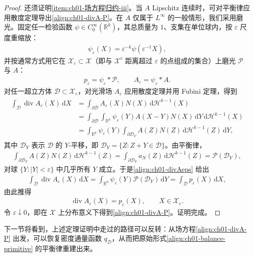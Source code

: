 \documentclass[../../main.tex]{subfiles}
\begin{document}
\begin{proof}
还须证明\cref{item:ch01-场方程归约-iii}。当 $A$ Lipschitz 连续时，可对平衡律应用散度定理导出\cref{align:ch01-divA-P}。在 $A$ 仅属于 $L^{\infty}$ 的一般情形，我们采用磨光。固定任一检验函数 $\psi\in C_{0}^{\infty}(\mathbb{R}^{k})$，其总质量为 $1$、支集在单位球内，按 $\varepsilon$ 尺度重缩放：
\begin{align}
\psi_{\varepsilon}(X)=\varepsilon^{-k}\psi(\varepsilon^{-1}X),\label{align:ch01-mollifier}
\end{align}
并按通常方式用它在 $\mathscr{X}_{\varepsilon}\subset\mathscr{X}$（即与 $\mathscr{X}^{c}$ 距离超过 $\varepsilon$ 的点组成的集合）上磨光 $\mathscr{P}$ 与 $A$：
\begin{align}
p_{\varepsilon}=\psi_{\varepsilon}*\mathscr{P},\qquad A_{\varepsilon}=\psi_{\varepsilon}*A.\label{align:ch01-mollified}
\end{align}
对任一超立方体 $\mathscr{D}\subset\mathscr{X}_{\varepsilon}$，对光滑场 $A_{\varepsilon}$ 应用散度定理并用 Fubini 定理，得到
\begin{align}
\begin{aligned}
\int_{\mathscr{D}}\operatorname{div} A_{\varepsilon}(X)\,\mathrm{d}X
&=\int_{\partial\mathscr{D}}A_{\varepsilon}(X)N(X)\,\mathrm{d}\mathscr{H}^{k-1}(X)\\
&=\int_{\partial\mathscr{D}}\int_{\mathbb{R}^{k}}\psi_{\varepsilon}(Y)A(X-Y)N(X)\,\mathrm{d}Y\,\mathrm{d}\mathscr{H}^{k-1}(X)\\
&=\int_{\mathbb{R}^{k}}\psi_{\varepsilon}(Y)\int_{\partial\mathscr{D}_{Y}}A(Z)N(Z)\,\mathrm{d}\mathscr{H}^{k-1}(Z)\,\mathrm{d}Y,
\end{aligned}\label{align:ch01-divAeps}
\end{align}
其中 $\mathscr{D}_{Y}$ 表示 $\mathscr{D}$ 的 $Y$-平移，即 $\mathscr{D}_{Y}=\{Z:Z+Y\in\mathscr{D}\}$。由平衡律，
\begin{align}
\int_{\partial\mathscr{D}_{Y}}A(Z)N(Z)\,\mathrm{d}\mathscr{H}^{k-1}(Z)=\int_{\partial\mathscr{D}_{Y}}a_{N}(Z)\,\mathrm{d}\mathscr{H}^{k-1}(Z)=\mathscr{P}(\mathscr{D}_{Y}),\label{align:ch01-trace-P}
\end{align}
对球 $\{Y:|Y|<\varepsilon\}$ 中几乎所有 $Y$ 成立。于是\cref{align:ch01-divAeps} 给出
\begin{align}
\int_{\mathscr{D}}\operatorname{div} A_{\varepsilon}(X)\,\mathrm{d}X=\int_{\mathbb{R}^{k}}\psi_{\varepsilon}(Y)\mathscr{P}(\mathscr{D}_{Y})\,\mathrm{d}Y=\int_{\mathscr{D}}p_{\varepsilon}(X)\,\mathrm{d}X,\label{align:ch01-divAeps-final}
\end{align}
由此推得
\begin{align}
\operatorname{div} A_{\varepsilon}(X)=p_{\varepsilon}(X),\qquad X\in\mathscr{X}_{\varepsilon}.\label{align:ch01-divAeps-equality}
\end{align}
令 $\varepsilon\downarrow 0$，即在 $\mathscr{X}$ 上分布意义下得到\cref{align:ch01-divA-P}。证明完成。
\end{proof}

下一节将看到，上述定理证明中走过的路径可以反转：从场方程\cref{align:ch01-divA-P} 出发，可以恢复密度通量函数 $q_{\mathscr{D}}$，从而把原始形式\cref{align:ch01-balance-primitive} 的平衡律重建出来。
\end{document}
